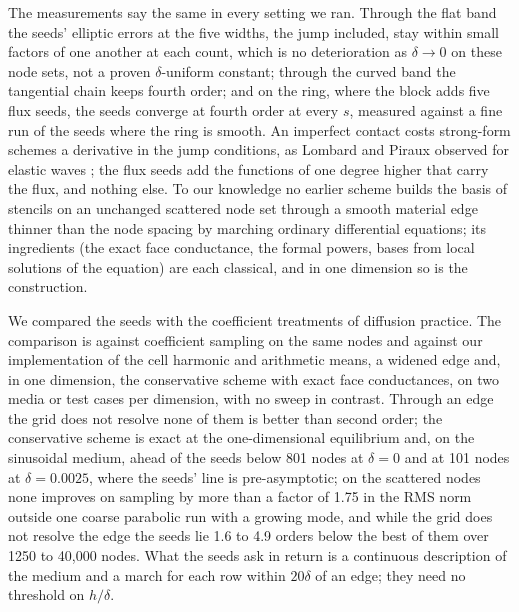 \documentclass[11pt]{amsart}
\theoremstyle{definition}
\theoremstyle{remark}
\begin{document}
The measurements say the same in every setting we ran. Through the flat
band the seeds' elliptic errors at the five widths, the jump included, stay
within small factors of one another at each count, which is no
deterioration as $\delta \to 0$ on these node sets, not a proven
$\delta$-uniform constant; through the curved band the tangential chain
keeps fourth order; and on the ring, where the block adds five flux seeds,
the seeds converge at fourth order at every $s$, measured against a fine
run of the seeds where the ring is smooth.
An imperfect contact
costs strong-form schemes a derivative in the jump conditions, as Lombard
and Piraux observed for elastic waves
\cite{LombardPiraux2003,LombardPiraux2006}; the flux seeds add the functions
of one degree higher that carry the flux, and nothing else. To our
knowledge no earlier scheme builds the basis of stencils on an unchanged
scattered node set through a smooth material edge thinner than the node
spacing by marching ordinary differential equations; its ingredients (the
exact face conductance, the formal powers, bases from local solutions of
the equation) are each classical, and in one dimension so is the
construction.

We compared the seeds with the coefficient treatments of diffusion practice.
The comparison is against coefficient sampling on the same nodes and against
our implementation of the cell harmonic and arithmetic means, a widened edge
and, in one dimension, the conservative scheme with exact face conductances,
on two media or test cases per dimension, with no sweep in contrast. Through
an edge the grid does not resolve none of them is better than second order;
the conservative scheme is exact at the one-dimensional equilibrium and, on
the sinusoidal medium, ahead of the seeds below 801 nodes at $\delta = 0$
and at 101 nodes at $\delta = 0.0025$, where the seeds' line is
pre-asymptotic; on the scattered nodes none improves on sampling by more
than a factor of 1.75 in the RMS norm outside one coarse parabolic run with
a growing mode, and while the grid does not resolve the edge the seeds lie
1.6 to 4.9 orders below the best of them over 1250 to 40,000 nodes. What the
seeds ask in return is a continuous description of the medium and a march
for each row within $20\delta$ of an edge; they need no threshold on
$h / \delta$.

\clearpage
\appendix
\end{document}
